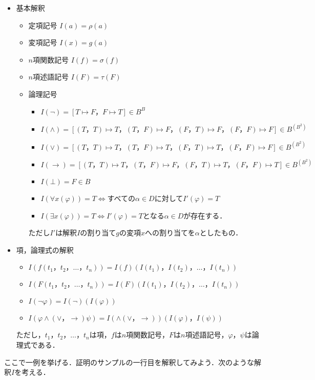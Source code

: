 \documentclass[10pt,b5paper,papersize,dvipdfmx]{jsbook}
\begin{document}
\begin{itemize}
\item 基本解釈
\begin{itemize}
\item 定項記号 $I(a)=\rho(a)$
\item 変項記号 $I(x)=g(a)$
\item $n$項関数記号 $I(f)=\sigma(f)$
\item $n$項述語記号 $I(F)=\tau(F)$
\item 論理記号
\begin{itemize}
\item $I(\lnot)=[T\mapsto F，F\mapsto T]\in B^B$
\item $I(\land)=[(T，T)\mapsto T，(T，F)\mapsto F，(F，T)\mapsto F，(F，F)\mapsto F]\in B^{(B^2)}$
\item $I(\lor)=[(T，T)\mapsto T，(T，F)\mapsto T，(F，T)\mapsto T，(F，F)\mapsto F]\in B^{(B^2)}$
\item $I(\to)=[(T，T)\mapsto T，(T，F)\mapsto F，(F，T)\mapsto T，(F，F)\mapsto T]\in B^{(B^2)}$
\item $I(\bot)=F\in B$
\item $I(\forall x(\varphi))=T\Leftrightarrow$すべての$\alpha \in D$に対して$I'(\varphi)=T$
\item $I(\exists x(\varphi))=T\Leftrightarrow$$I'(\varphi)=T$となる$\alpha \in D$が存在する．
\end{itemize}
ただし$I'$は解釈$I$の割り当て$g$の変項$x$への割り当てを$\alpha$としたもの．
\end{itemize}
\item 項，論理式の解釈
\begin{itemize}
\item $I(f(t_1，t_2，\dots，t_n))=I(f)(I(t_1)，I(t_2)， \dots，I(t_n))$
\item $I(F(t_1，t_2，\dots，t_n))=I(F)(I(t_1)，I(t_2)， \dots，I(t_n))$
\item $I(\lnot \varphi)=I(\lnot)(I(\varphi))$
\item $I(\varphi \land(\lor，\to)\psi)=I(\land(\lor，\to))(I(\varphi)，I(\psi))$
\end{itemize}
ただし，$t_1，t_2，\dots，t_n$は項，$f$は$n$項関数記号，$F$は$n$項述語記号，$\varphi，\psi$は論理式である．
\end{itemize}
ここで一例を挙げる．証明のサンプルの一行目を解釈してみよう．次のような解釈$I$を考える．
\end{document}
